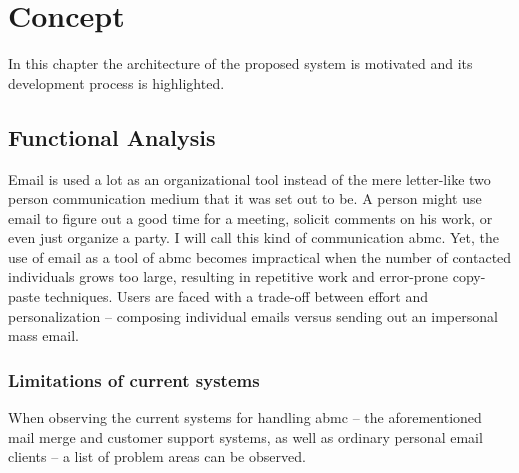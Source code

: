 \chapter{Concept}
\label{chapter:Concept}

In this chapter the architecture of the proposed system is motivated and its development process is highlighted.

\section{Functional Analysis}
\label{section:FunctionalAnalysis}

Email is used a lot as an organizational tool instead of the mere letter-like two person communication medium that it was set out to be. A person might use email to figure out a good time for a meeting, solicit comments on his work, or even just organize a party. I will call this kind of communication \gls{abmc}. Yet, the use of email as a tool of \gls{abmc} becomes impractical when the number of contacted individuals grows too large, resulting in repetitive work and error-prone copy-paste techniques. Users are faced with a trade-off between effort and personalization -- composing individual emails versus sending out an impersonal mass email.

\subsection{Limitations of current systems}

When observing the current systems for handling \gls{abmc} -- the aforementioned mail merge and customer support systems, as well as ordinary personal email clients -- a list of problem areas can be observed.

